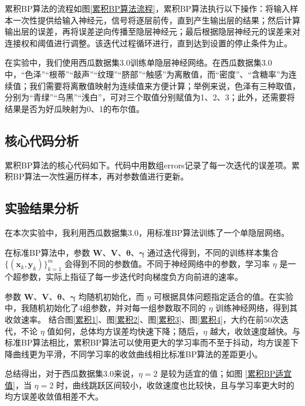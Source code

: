 \documentclass{ctexart}
\begin{document}
	累积BP算法的流程如图\ref{累积BP算法流程}，累积BP算法执行以下操作：将输入样本一次性提供给输入神经元，信号将逐层前传，直到产生输出层的结果；然后计算输出层的误差，再将误差逆向传播至隐层神经元；最后根据隐层神经元的误差来对连接权和阈值进行调整。该迭代过程循环进行，直到达到设置的停止条件为止。
	
	在实验中，我们使用西瓜数据集3.0训练单隐层神经网络。在西瓜数据集3.0中，“色泽”“根蒂”“敲声”“纹理”“脐部”“触感”为离散值，而“密度”、“含糖率”为连续值；我们需要将离散值映射为连续值来方便计算；举例来说，色泽有三种取值，分别为“青绿”“乌黑”“浅白”，可对三个取值分别赋值为1、2、3；此外，还需要将结果是否为好瓜映射为0、1的布尔值。
		
	\subsection{核心代码分析}
	
	累积BP算法的核心代码如下。代码中用数组errors记录了每一次迭代的误差项。累积BP算法一次性遍历样本，再对参数值进行更新。\\
	
	
	
	\subsection{实验结果分析}
	
	在本次实验中，我利用西瓜数据集3.0，用标准BP算法训练了一个单隐层网络。
	
	在标准BP算法中，参数 $\bm{W}$、$\bm{V}$、$\bm{\theta}$、$\bm{\gamma}$ 通过迭代得到，不同的训练样本集合 $\{(\bm{x}_k,\bm{y}_k)\}_{k=1}^m$ 会得到不同的参数值。不同于神经网络中的参数，学习率 $\eta$ 是一个超参数，实际上指征了每一步迭代时向梯度负方向前进的速率。
	
	参数 $\bm{W}$、$\bm{V}$、$\bm{\theta}$、$\bm{\gamma}$ 均随机初始化，而 $\eta$ 可根据具体问题指定适合的值。在实验中，我随机初始化了4组参数，并对每一组参数取不同的 $\eta$ 训练神经网络，得到其收敛速率。
	结合图\ref{累积1}、图\ref{累积2}、图\ref{累积3}、图\ref{累积4}，大约在前50次迭代，不论 $\eta$ 值如何，总体均方误差均快速下降；随后，$\eta$ 越大，收敛速度越快。与标准BP算法相比，累积BP算法可以使用更大的学习率而不至于抖动，均方误差下降曲线更为平滑，不同学习率的收敛曲线相比标准BP算法的差距更小。
	
	总结得出，对于西瓜数据集3.0来说，$\eta=2$ 是较为适宜的值；如图 \ref{累积BP适宜值}，当 $\eta=2$ 时，曲线跳跃区间较小，收敛速度也比较快，且与学习率更大时的均方误差收敛值相差不大。
	
\end{document}
